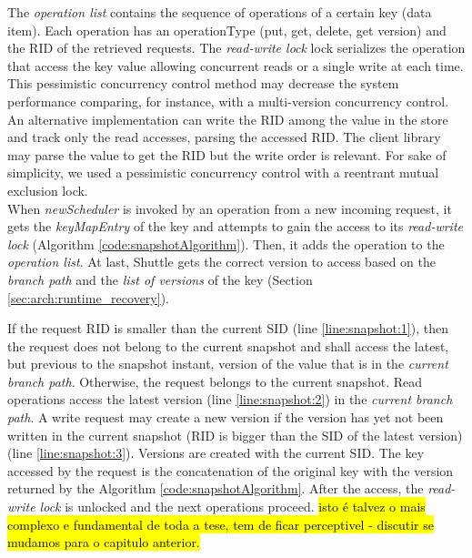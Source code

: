 The \emph{operation list} contains the sequence of operations of a certain key (data item). Each operation has an operationType (put, get, delete, get version) and the \ac{RID} of the retrieved requests. The \emph{read-write lock} lock serializes the operation that access the key value allowing concurrent reads or a single write at each time. This pessimistic concurrency control method may decrease the system performance comparing, for instance, with a multi-version concurrency control. An alternative implementation can write the \ac{RID} among the value in the store and track only the read accesses, parsing the accessed \ac{RID}. The client library may parse the value to get the \ac{RID} but the write order is relevant. For sake of simplicity, we used a pessimistic concurrency control with a reentrant mutual exclusion lock.\\

When \emph{newScheduler} is invoked by an operation from a new incoming request, it gets the \emph{keyMapEntry} of the key and attempts to gain the access to its \emph{read-write lock} (Algorithm \ref{code:snapshotAlgorithm}). Then, it adds the operation to the \emph{operation list}. At last, Shuttle gets the correct version to access based on the \emph{branch path} and the \emph{list of versions} of the key (Section \ref{sec:arch:runtime_recovery}). 

If the request \ac{RID} is smaller than the current \acf{SID} (line \ref{line:snapshot:1}), then the request does not belong to the current snapshot and shall access the latest, but previous to the snapshot instant, version of the value that is in the  \textit{current branch path}. Otherwise, the request belongs to the current snapshot. Read operations access the latest version (line \ref{line:snapshot:2}) in the  \textit{current branch path}. A write request may create a new version if the version has yet not been written in the current snapshot (\ac{RID} is bigger than the \ac{SID} of the latest version) (line \ref{line:snapshot:3}). Versions are created with the current \acf{SID}. The key accessed by the request is the concatenation of the original key with the version returned by the Algorithm \ref{code:snapshotAlgorithm}. After the access, the \emph{read-write lock} is unlocked and the next operations proceed. \hl{isto é talvez o mais complexo e fundamental de toda a tese, tem de ficar perceptivel - discutir se mudamos para o capitulo anterior.} 



